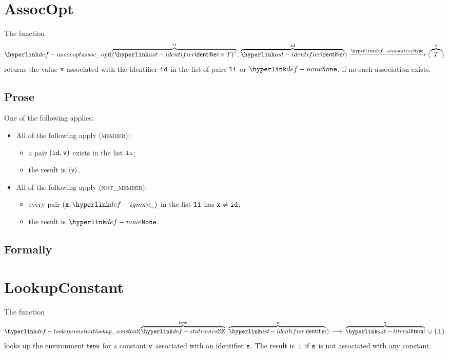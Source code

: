 \section{AssocOpt}
\hypertarget{def-assocopt}{}
The function
\[
  \assocopt(\overname{(\identifier\times T)^*}{\vli} \aslsep \overname{\identifier}{\id}) \typearrow \langle \overname{T}{\vv} \rangle
\]
returns the value $\texttt{v}$ associated with the identifier $\texttt{id}$ in the list of pairs $\texttt{li}$ or $\None$, if no such association exists.

\subsection{Prose}
One of the following applies:
\begin{itemize}
  \item All of the following apply (\textsc{member}):
  \begin{itemize}
    \item a pair $(\texttt{id},\texttt{v})$ exists in the list $\texttt{li}$;
    \item the result is $\langle\texttt{v}\rangle$.
  \end{itemize}

  \item All of the following apply (\textsc{not\_member}):
  \begin{itemize}
    \item every pair $(\vx,\Ignore)$ in the list $\texttt{li}$ has $\texttt{x}\neq\texttt{id}$;
    \item the result is $\None$.
  \end{itemize}
\end{itemize}

\subsection{Formally}

\section{LookupConstant}
\hypertarget{def-lookupconstant}{}
The function
\[
  \lookupconstant(\overname{\staticenvs}{\tenv} \aslsep \overname{\identifier}{\vs})
  \;\aslto\; \overname{\literal}{\vv}\ \cup\ \{\bot\}
\]
looks up the environment $\textsf{tenv}$ for a constant $\texttt{v}$ associated with an identifier
$\texttt{s}$. The result is $\bot$ if $\texttt{s}$ is not associated with any constant.

